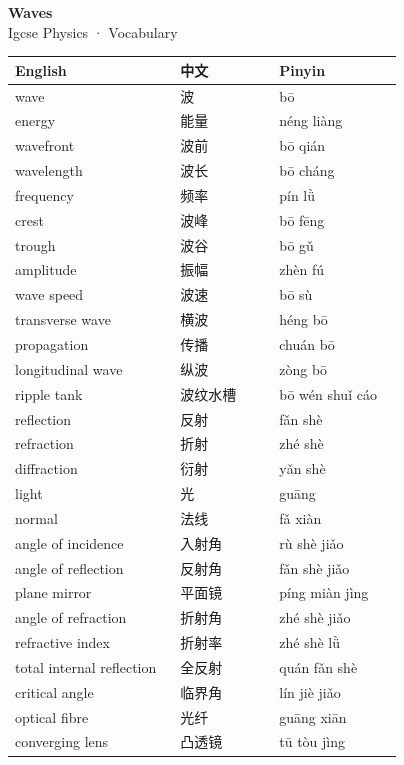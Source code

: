 \documentclass[11pt]{article}
\begin{document}
\begin{center}
  {\LARGE\bfseries Waves}\\[0.35em]
  {\large Igcse Physics · Vocabulary}
\end{center}
\vspace{0.6em}

\begin{longtable}{@{}p{0.40\linewidth}p{0.24\linewidth}p{0.30\linewidth}@{}}
\toprule
\textbf{English} & \textbf{中文} & \textbf{Pinyin} \\
\midrule
\endhead
\bottomrule
\endlastfoot
wave & 波 & bō \\
energy & 能量 & néng liàng \\
wavefront & 波前 & bō qián \\
wavelength & 波长 & bō cháng \\
frequency & 频率 & pín lǜ \\
crest & 波峰 & bō fēng \\
trough & 波谷 & bō gǔ \\
amplitude & 振幅 & zhèn fú \\
wave speed & 波速 & bō sù \\
transverse wave & 横波 & héng bō \\
propagation & 传播 & chuán bō \\
longitudinal wave & 纵波 & zòng bō \\
ripple tank & 波纹水槽 & bō wén shuǐ cáo \\
reflection & 反射 & fǎn shè \\
refraction & 折射 & zhé shè \\
diffraction & 衍射 & yǎn shè \\
light & 光 & guāng \\
normal & 法线 & fǎ xiàn \\
angle of incidence & 入射角 & rù shè jiǎo \\
angle of reflection & 反射角 & fǎn shè jiǎo \\
plane mirror & 平面镜 & píng miàn jìng \\
angle of refraction & 折射角 & zhé shè jiǎo \\
refractive index & 折射率 & zhé shè lǜ \\
total internal reflection & 全反射 & quán fǎn shè \\
critical angle & 临界角 & lín jiè jiǎo \\
optical fibre & 光纤 & guāng xiān \\
converging lens & 凸透镜 & tū tòu jìng \\

\end{longtable}
\end{document}
